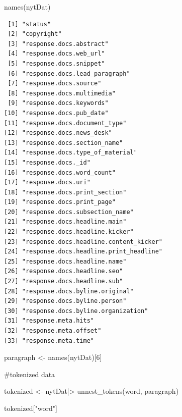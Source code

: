 \documentclass[
  letterpaper,
  DIV=11,
  numbers=noendperiod]{scrartcl}
\newenvironment{Shaded}{\begin{snugshade}}{\end{snugshade}}
\newcommand{\CommentTok}[1]{\textcolor[rgb]{0.37,0.37,0.37}{#1}}
\newcommand{\DecValTok}[1]{\textcolor[rgb]{0.68,0.00,0.00}{#1}}
\newcommand{\FunctionTok}[1]{\textcolor[rgb]{0.28,0.35,0.67}{#1}}
\newcommand{\NormalTok}[1]{\textcolor[rgb]{0.00,0.23,0.31}{#1}}
\newcommand{\OtherTok}[1]{\textcolor[rgb]{0.00,0.23,0.31}{#1}}
\newcommand{\SpecialCharTok}[1]{\textcolor[rgb]{0.37,0.37,0.37}{#1}}
\newcommand{\StringTok}[1]{\textcolor[rgb]{0.13,0.47,0.30}{#1}}
\begin{document}
\begin{Shaded}
\begin{Highlighting}[]
\FunctionTok{names}\NormalTok{(nytDat)}
\end{Highlighting}
\end{Shaded}

\begin{verbatim}
 [1] "status"                               
 [2] "copyright"                            
 [3] "response.docs.abstract"               
 [4] "response.docs.web_url"                
 [5] "response.docs.snippet"                
 [6] "response.docs.lead_paragraph"         
 [7] "response.docs.source"                 
 [8] "response.docs.multimedia"             
 [9] "response.docs.keywords"               
[10] "response.docs.pub_date"               
[11] "response.docs.document_type"          
[12] "response.docs.news_desk"              
[13] "response.docs.section_name"           
[14] "response.docs.type_of_material"       
[15] "response.docs._id"                    
[16] "response.docs.word_count"             
[17] "response.docs.uri"                    
[18] "response.docs.print_section"          
[19] "response.docs.print_page"             
[20] "response.docs.subsection_name"        
[21] "response.docs.headline.main"          
[22] "response.docs.headline.kicker"        
[23] "response.docs.headline.content_kicker"
[24] "response.docs.headline.print_headline"
[25] "response.docs.headline.name"          
[26] "response.docs.headline.seo"           
[27] "response.docs.headline.sub"           
[28] "response.docs.byline.original"        
[29] "response.docs.byline.person"          
[30] "response.docs.byline.organization"    
[31] "response.meta.hits"                   
[32] "response.meta.offset"                 
[33] "response.meta.time"                   
\end{verbatim}

\begin{Shaded}
\begin{Highlighting}[]
\NormalTok{paragraph }\OtherTok{\textless{}{-}} \FunctionTok{names}\NormalTok{(nytDat)[}\DecValTok{6}\NormalTok{]}

\CommentTok{\#tokenized data}

\NormalTok{tokenized }\OtherTok{\textless{}{-}}\NormalTok{ nytDat}\SpecialCharTok{|\textgreater{}}
  \FunctionTok{unnest\_tokens}\NormalTok{(word, paragraph)}


\NormalTok{tokenized[}\StringTok{"word"}\NormalTok{]}
\end{Highlighting}
\end{Shaded}
\end{document}
